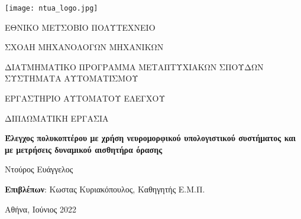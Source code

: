     \begin{center}
    
    \texttt{[image: ntua\_logo.jpg]}
    
    \vspace{5mm}
    
    {\small ΕΘΝΙΚΟ ΜΕΤΣΟΒΙΟ ΠΟΛΥΤΕΧΝΕΙΟ}
    
    {\small ΣΧΟΛΗ ΜΗΧΑΝΟΛΟΓΩΝ ΜΗΧΑΝΙΚΩΝ}
    
    \vspace{5mm}
    
    {\footnotesize ΔΙΑΤΜΗΜΑΤΙΚΟ ΠΡΟΓΡΑΜΜΑ ΜΕΤΑΠΤΥΧΙΑΚΩΝ ΣΠΟΥΔΩΝ \\
                   ΣΥΣΤΗΜΑΤΑ ΑΥΤΟΜΑΤΙΣΜΟΥ}
    
    {\footnotesize ΕΡΓΑΣΤΗΡΙΟ ΑΥΤΟΜΑΤΟΥ ΕΛΕΓΧΟΥ}
    
    \vspace{5mm}
    
    {\small ΔΙΠΛΩΜΑΤΙΚΗ ΕΡΓΑΣΙΑ}
    
    \textbf{{\Huge Έλεγχος πολυκοπτέρου με χρήση νευρομορφικού υπολογιστικού συστήματος και με μετρήσεις δυναμικού αισθητήρα όρασης}}

    \vspace{10mm}

    {\Large Ντούρος Ευάγγελος}
    
    \vspace{20mm}
    
    \textbf{Επιβλέπων}: Κωστας Κυριακόπουλος, Καθηγητής Ε.Μ.Π.
    
    \vspace{20mm}
    
    Αθήνα, Ιούνιος 2022
    
    \end{center}
